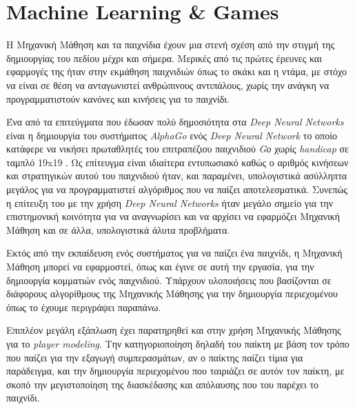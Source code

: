 \section{Machine Learning \& Games}
Η Μηχανική Μάθηση και τα παιχνίδια έχουν μια στενή σχέση από την στιγμή της δημιουργίας του πεδίου μέχρι και σήμερα. Μερικές από τις πρώτες έρευνες και εφαρμογές της ήταν στην εκμάθηση παιχνιδιών όπως το σκάκι και η ντάμα, με στόχο να είναι σε θέση να ανταγωνιστεί ανθρώπινους αντιπάλους, χωρίς την ανάγκη να προγραμματιστούν κανόνες και κινήσεις για το παιχνίδι.
\par
Ένα από τα επιτεύγματα που έδωσαν πολύ δημοσιότητα στα \textit{Deep Neural Networks} είναι η δημιουργία του συστήματος \textit{AlphaGo} ενός \textit{Deep Neural Network} το οποίο κατάφερε να νικήσει πρωταθλητές του επιτραπέζιου παιχνιδιού \textit{Gο} χωρίς \textit{handicap} σε ταμπλό 19x19 \cite{alphago}. Ως επίτευγμα είναι ιδιαίτερα εντυπωσιακό καθώς ο αριθμός κινήσεων και στρατηγικών αυτού του παιχνιδιού ήταν, και παραμένει, υπολογιστικά ασύλληπτα μεγάλος για να προγραμματιστεί αλγόριθμος που να παίζει αποτελεσματικά. Συνεπώς η επίτευξη του με την χρήση \textit{Deep Neural Networks} ήταν μεγάλο σημείο για την επιστημονική κοινότητα για να αναγνωρίσει και να αρχίσει να εφαρμόζει Μηχανική Μάθηση και σε άλλα, υπολογιστικά άλυτα προβλήματα.
\par
Εκτός από την εκπαίδευση ενός συστήματος για να παίζει ένα παιχνίδι, η Μηχανική Μάθηση μπορεί να εφαρμοστεί, όπως και έγινε σε αυτή την εργασία, για την δημιουργία κομματιών ενός παιχνιδιού. Υπάρχουν υλοποιήσεις που βασίζονται σε διάφορους αλγορίθμους της Μηχανικής Μάθησης για την δημιουργία περιεχομένου όπως το έχουμε περιγράψει παραπάνω.
\par
Επιπλέον μεγάλη εξάπλωση έχει παρατηρηθεί και στην χρήση Μηχανικής Μάθησης για το \textit{player modeling}. Την κατηγοριοποίηση δηλαδή του παίκτη με βάση τον τρόπο που παίζει για την εξαγωγή συμπερασμάτων, αν ο παίκτης παίζει τίμια για παράδειγμα, και την δημιουργία περιεχομένου που ταιριάζει σε αυτόν τον παίκτη, με σκοπό την μεγιστοποίηση της διασκέδασης και απόλαυσης που του παρέχει το παιχνίδι. 


